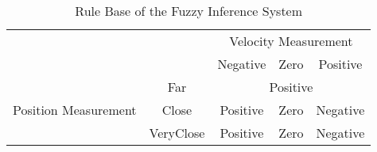 \begin{table}[h]
	\begin{center}
	\caption{Rule Base of the Fuzzy Inference System}\label{tab:rulebase}
		\begin{tabular}{ccccc}
		\multicolumn{2}{c}{}  & \multicolumn{3}{c}{Velocity Measurement}\\ \cline{3-5} 
		\multicolumn{2}{c|}{}  & \multicolumn{1}{c|}{Negative} & \multicolumn{1}{c|}{Zero} & \multicolumn{1}{c|}{Positive} \\ \cline{2-5} 
		\multicolumn{1}{c|}{\multirow{3}{*}{Position Measurement}} & \multicolumn{1}{c|}{Far} & \multicolumn{3}{c|}{Positive} \\ \cline{2-5} 
		\multicolumn{1}{c|}{} & \multicolumn{1}{c|}{Close} & \multicolumn{1}{c|}{Positive} & \multicolumn{1}{c|}{Zero} & \multicolumn{1}{c|}{Negative}\\ \cline{2-5}
		\multicolumn{1}{c|}{} & \multicolumn{1}{c|}{VeryClose} & \multicolumn{1}{c|}{Positive} & \multicolumn{1}{c|}{Zero} & \multicolumn{1}{c|}{Negative} \\ \cline{2-5} 
		\end{tabular}
	\end{center}
\end{table}